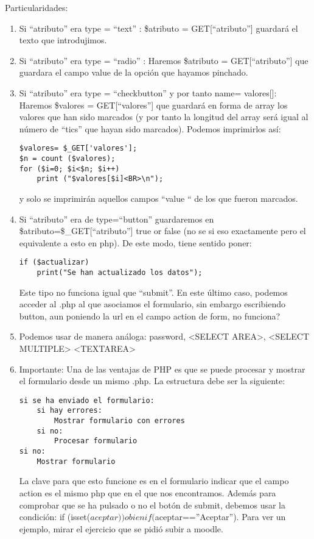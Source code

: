 \documentclass{apuntes}
\begin{document}
Particularidades:
\begin{enumerate}
\item Si “atributo” era type = “text” : \$atributo = GET[“atributo”] guardará el texto que introdujimos.

\item Si “atributo” era type = “radio” : Haremos \$atributo = GET[“atributo”] que guardara el campo value de la opción que hayamos pinchado.

\item Si “atributo” era type = “checkbutton”  y por tanto name= valores[]: Haremos \$valores = GET[“valores”] que guardará en forma de array los valores que han sido marcados (y por tanto la longitud del array será igual al número de “tics” que hayan sido marcados). Podemos imprimirlos así:
\begin{verbatim}
$valores= $_GET['valores'];
$n = count ($valores);
for ($i=0; $i<$n; $i++)
    print ("$valores[$i]<BR>\n");
\end{verbatim}
y solo se imprimirán aquellos campos “value “ de los que fueron marcados.

\item Si “atributo” era de type=“button” guardaremos en \$atributo=\$\_GET[“atributo”] true or false (no se si eso exactamente pero el equivalente a esto en php). De este modo, tiene sentido poner:
\begin{verbatim}
if ($actualizar)
    print("Se han actualizado los datos");
\end{verbatim}
\begin{obs} Este tipo no funciona igual que “submit”. En este último caso, podemos acceder al .php al que asociamos el formulario, sin embargo escribiendo button, aun poniendo la url en el campo action de form, no funciona?
\end{obs}

\item Podemos usar de manera análoga: password, <SELECT AREA>, <SELECT MULTIPLE> <TEXTAREA>

\item Importante:
Una de las ventajas de PHP es que se puede procesar y mostrar el formulario desde un mismo .php. La estructura debe ser la siguiente:
\begin{verbatim}
si se ha enviado el formulario:
    si hay errores:
        Mostrar formulario con errores
    si no:
        Procesar formulario
si no:
    Mostrar formulario
\end{verbatim}
La clave para que esto funcione es en el formulario indicar que el campo action es el mismo php que en el que nos encontramos. Además para comprobar que se ha pulsado o no el botón de submit, debemos usar la condición:
if (isset($aceptar)) o bien if ($aceptar==”Aceptar”).
Para ver un ejemplo, mirar el ejercicio que se pidió subir a moodle.
\end{enumerate}
\end{document}
